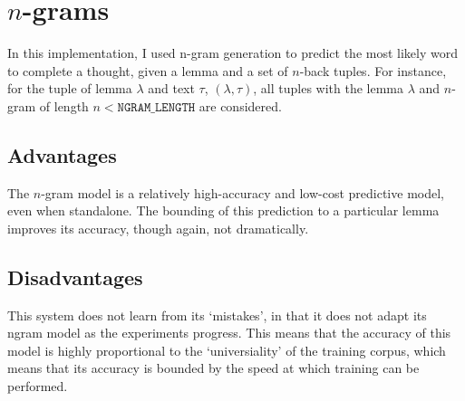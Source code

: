 \documentclass{article}
\begin{document}
\section{$n$-grams}
In this implementation, I used n-gram generation to predict the most likely word to complete a thought, given a lemma and a set of $n$-back tuples. For instance, for the tuple of lemma $\lambda$ and text $\tau$, $\left(\lambda, \tau\right)$, all tuples with the lemma $\lambda$ and $n$-gram of length $n < \texttt{NGRAM\_LENGTH}$ are considered.

\subsection{Advantages}
The $n$-gram model is a relatively high-accuracy and low-cost predictive model, even when standalone. The bounding of this prediction to a particular lemma improves its accuracy, though again, not dramatically.

\subsection{Disadvantages}
This system does not learn from its `mistakes', in that it does not adapt its ngram model as the experiments progress. This means that the accuracy of this model is highly proportional to the `universiality' of the training corpus, which means that its accuracy is bounded by the speed at which training can be performed.
\end{document}
